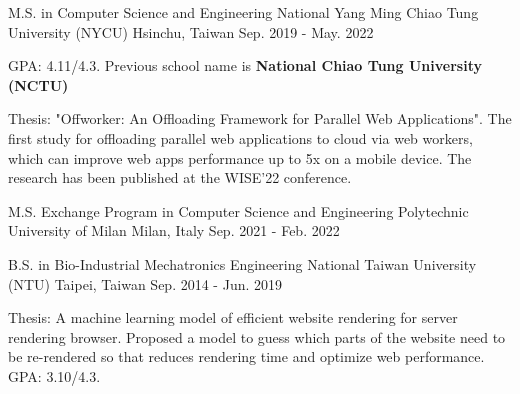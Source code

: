 
\vspace{-2mm}

\begin{cventries}

  
\cventry
  {M.S. in Computer Science and Engineering} %
  {National Yang Ming Chiao Tung University (NYCU)} %
  {Hsinchu, Taiwan} %
  {Sep. 2019 - May. 2022} %
  {
    \begin{cvitems} %
      \item {GPA: 4.11/4.3. Previous school name is \textbf{National Chiao Tung University (NCTU)}}
      \item {Thesis: "Offworker: An Offloading Framework for Parallel Web Applications".
      The first study for offloading parallel web applications to cloud via web workers,
      which can improve web apps performance up to 5x on a mobile device.
      The research has been published at the WISE'22 conference.
      }
    \end{cvitems}
  }

  \vspace{-3mm}

\cventry
    {M.S. Exchange Program in Computer Science and Engineering} %
    {Polytechnic University of Milan} %
    {Milan, Italy} %
    {Sep. 2021 - Feb. 2022} %
    {}

  \vspace{-6mm}

  \cventry
    {B.S. in Bio-Industrial Mechatronics Engineering} %
    {National Taiwan University (NTU)} %
    {Taipei, Taiwan} %
    {Sep. 2014 - Jun. 2019} %
    {
      \begin{cvitems} %
        \item {Thesis: A machine learning model of efficient website rendering for server rendering browser.
          Proposed a model to guess which parts of the website need to be re-rendered so that reduces rendering time
          and optimize web performance. GPA: 3.10/4.3. 
        }
      \end{cvitems}
    }

\end{cventries}
